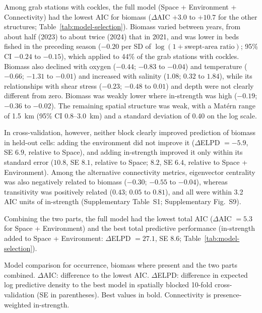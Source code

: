 \begin{spacing}{2}
Among grab stations with cockles, the full model (Space + Environment + Connectivity) had the lowest AIC for biomass ($\Delta$AIC $+3.0$ to $+10.7$ for the other structures; Table~\ref{tab:model-selection}). Biomass varied between years, from about half (2023) to about twice (2024) that in 2021, and was lower in beds fished in the preceding season ($-0.20$ per SD of $\log(1 + \text{swept-area ratio})$; 95\% CI $-0.24$ to $-0.15$), which applied to 44\% of the grab stations with cockles. Biomass also declined with oxygen ($-0.44$; $-0.83$ to $-0.04$) and temperature ($-0.66$; $-1.31$ to $-0.01$) and increased with salinity ($1.08$; $0.32$ to $1.84$), while its relationships with shear stress ($-0.23$; $-0.48$ to $0.01$) and depth were not clearly different from zero. Biomass was weakly lower where in-strength was high ($-0.19$; $-0.36$ to $-0.02$). The remaining spatial structure was weak, with a Mat\'ern range of 1.5~km (95\% CI 0.8--3.0~km) and a standard deviation of 0.40 on the log scale.

In cross-validation, however, neither block clearly improved prediction of biomass in held-out cells: adding the environment did not improve it ($\Delta$ELPD $=-5.9$, SE $6.9$, relative to Space), and adding in-strength improved it only within its standard error ($10.8$, SE $8.1$, relative to Space; $8.2$, SE $6.4$, relative to Space + Environment). Among the alternative connectivity metrics, eigenvector centrality was also negatively related to biomass ($-0.30$; $-0.55$ to $-0.04$), whereas transitivity was positively related ($0.43$; $0.05$ to $0.81$), and all were within 3.2 AIC units of in-strength (Supplementary Table~S1; Supplementary Fig.~S9).

Combining the two parts, the full model had the lowest total AIC ($\Delta$AIC $=5.3$ for Space + Environment) and the best total predictive performance (in-strength added to Space + Environment: $\Delta$ELPD $=27.1$, SE $8.6$; Table~\ref{tab:model-selection}).

\begin{table}[ht]
\centering
\small
\caption{Model comparison for occurrence, biomass where present and the two parts combined. $\Delta$AIC: difference to the lowest AIC. $\Delta$ELPD: difference in expected log predictive density to the best model in spatially blocked 10-fold cross-validation (SE in parentheses). Best values in bold. Connectivity is presence-weighted in-strength.}
\label{tab:model-selection}

\end{table}


\end{spacing}
